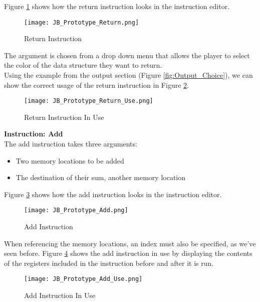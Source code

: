 Figure \ref{fig:Return_Instruction} shows how the return instruction looks in the instruction editor.

\begin{figure}[!hb]
  \caption{Return Instruction}
  \label{fig:Return_Instruction}
  \centering
  \texttt{[image: JB\_Prototype\_Return.png]}
\end{figure}

The argument is chosen from a drop down menu that allows the player to select
the color of the data structure they want to return.\\

Using the example from the output section (Figure \ref{fig:Output_Choice}),
we can show the correct usage of the return instruction in Figure \ref{fig:Return_Instruction_Use}.

\begin{figure}[!hb]
  \caption{Return Instruction In Use}
  \label{fig:Return_Instruction_Use}
  \centering
  \texttt{[image: JB\_Prototype\_Return\_Use.png]}
\end{figure}
\vfill
\clearpage

\textbf{Instruction: Add}\\

The add instruction takes three arguments:
\begin{itemize}
  \item Two memory locations to be added
  \item The destination of their sum, another memory location
\end{itemize}

Figure \ref{fig:Add_Instruction} shows how the add instruction looks in the
instruction editor.

\begin{figure}[!hb]
  \caption{Add Instruction}
  \label{fig:Add_Instruction}
  \centering
  \texttt{[image: JB\_Prototype\_Add.png]}
\end{figure}

When referencing the memory locations, an index must also be specified, as we've
seen before. Figure \ref{fig:Add_Instruction_Use} shows the add instruction in use by displaying
the contents of the registers included in the instruction before and after it is
run.

\begin{figure}[!hb]
  \caption{Add Instruction In Use}
  \label{fig:Add_Instruction_Use}
  \centering
  \texttt{[image: JB\_Prototype\_Add\_Use.png]}
\end{figure}

